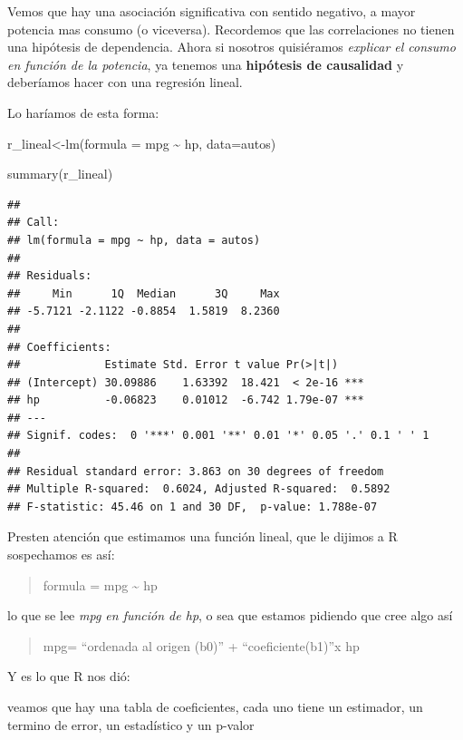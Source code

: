 \documentclass[
]{book}
\newenvironment{Shaded}{\begin{snugshade}}{\end{snugshade}}
\newcommand{\AttributeTok}[1]{\textcolor[rgb]{0.77,0.63,0.00}{#1}}
\newcommand{\FunctionTok}[1]{\textcolor[rgb]{0.00,0.00,0.00}{#1}}
\newcommand{\NormalTok}[1]{#1}
\newcommand{\OtherTok}[1]{\textcolor[rgb]{0.56,0.35,0.01}{#1}}
\newcommand{\SpecialCharTok}[1]{\textcolor[rgb]{0.00,0.00,0.00}{#1}}
\begin{document}
Vemos que hay una asociación significativa con sentido negativo, a mayor potencia mas consumo (o viceversa). Recordemos que las correlaciones no tienen una hipótesis de dependencia.
Ahora si nosotros quisiéramos \emph{explicar el consumo en función de la potencia}, ya tenemos una \textbf{hipótesis de causalidad} y deberíamos hacer con una regresión lineal.

Lo haríamos de esta forma:

\begin{Shaded}
\begin{Highlighting}[]
\NormalTok{r\_lineal}\OtherTok{\textless{}{-}}\FunctionTok{lm}\NormalTok{(}\AttributeTok{formula =}\NormalTok{ mpg }\SpecialCharTok{\textasciitilde{}}\NormalTok{ hp, }\AttributeTok{data=}\NormalTok{autos)}

\FunctionTok{summary}\NormalTok{(r\_lineal)}
\end{Highlighting}
\end{Shaded}

\begin{verbatim}
## 
## Call:
## lm(formula = mpg ~ hp, data = autos)
## 
## Residuals:
##     Min      1Q  Median      3Q     Max 
## -5.7121 -2.1122 -0.8854  1.5819  8.2360 
## 
## Coefficients:
##             Estimate Std. Error t value Pr(>|t|)    
## (Intercept) 30.09886    1.63392  18.421  < 2e-16 ***
## hp          -0.06823    0.01012  -6.742 1.79e-07 ***
## ---
## Signif. codes:  0 '***' 0.001 '**' 0.01 '*' 0.05 '.' 0.1 ' ' 1
## 
## Residual standard error: 3.863 on 30 degrees of freedom
## Multiple R-squared:  0.6024, Adjusted R-squared:  0.5892 
## F-statistic: 45.46 on 1 and 30 DF,  p-value: 1.788e-07
\end{verbatim}

Presten atención que estimamos una función lineal, que le dijimos a R sospechamos es así:

\begin{quote}
formula = mpg \textasciitilde{} hp
\end{quote}

lo que se lee \emph{mpg en función de hp}, o sea que estamos pidiendo que cree algo así

\begin{quote}
mpg= ``ordenada al origen (b0)'' + ``coeficiente(b1)''x hp
\end{quote}

Y es lo que R nos dió:

veamos que hay una tabla de coeficientes, cada uno tiene un estimador, un termino de error, un estadístico y un p-valor
\end{document}
